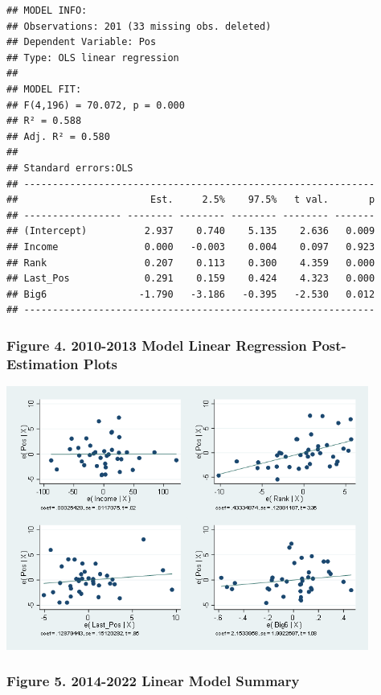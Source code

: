 \documentclass[
  12pt,
]{article}
\begin{document}
\begin{verbatim}
## MODEL INFO:
## Observations: 201 (33 missing obs. deleted)
## Dependent Variable: Pos
## Type: OLS linear regression 
## 
## MODEL FIT:
## F(4,196) = 70.072, p = 0.000
## R² = 0.588
## Adj. R² = 0.580 
## 
## Standard errors:OLS
## -------------------------------------------------------------
##                       Est.     2.5%    97.5%   t val.       p
## ----------------- -------- -------- -------- -------- -------
## (Intercept)          2.937    0.740    5.135    2.636   0.009
## Income               0.000   -0.003    0.004    0.097   0.923
## Rank                 0.207    0.113    0.300    4.359   0.000
## Last_Pos             0.291    0.159    0.424    4.323   0.000
## Big6                -1.790   -3.186   -0.395   -2.530   0.012
## -------------------------------------------------------------
\end{verbatim}

\subsubsection{Figure 4. 2010-2013 Model Linear Regression
Post-Estimation
Plots}\label{figure-4.-2010-2013-model-linear-regression-post-estimation-plots}

\includegraphics[width=450px]{2009.2013}

\newpage

\subsubsection{Figure 5. 2014-2022 Linear Model
Summary}\label{figure-5.-2014-2022-linear-model-summary}
\end{document}
